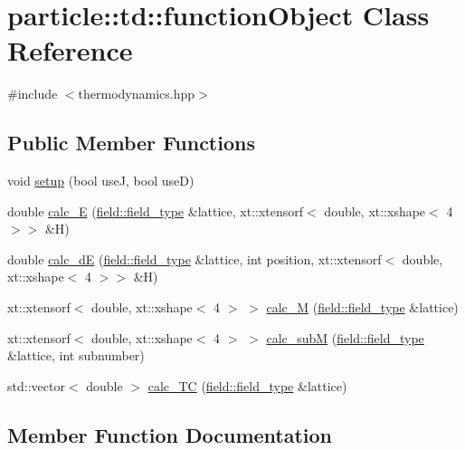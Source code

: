 \hypertarget{classparticle_1_1td_1_1functionObject}{}\section{particle\+:\+:td\+:\+:function\+Object Class Reference}
\label{classparticle_1_1td_1_1functionObject}


{\ttfamily \#include $<$thermodynamics.\+hpp$>$}

\subsection*{Public Member Functions}
\begin{DoxyCompactItemize}
\item 
void \hyperlink{classparticle_1_1td_1_1functionObject_a983e51c31ec252ab0567eb70bc0a8631}{setup} (bool useJ, bool useD)
\item 
double \hyperlink{classparticle_1_1td_1_1functionObject_a7fe36af330daf78dbe7ce3897e6dad3f}{calc\+\_\+E} (\hyperlink{classparticle_1_1field_1_1field__type}{field\+::field\+\_\+type} \&lattice, xt\+::xtensorf$<$ double, xt\+::xshape$<$ 4 $>$$>$ \&H)
\item 
double \hyperlink{classparticle_1_1td_1_1functionObject_a057b7d5d3315a6a36efa470d4136ceb7}{calc\+\_\+dE} (\hyperlink{classparticle_1_1field_1_1field__type}{field\+::field\+\_\+type} \&lattice, int position, xt\+::xtensorf$<$ double, xt\+::xshape$<$ 4 $>$$>$ \&H)
\item 
xt\+::xtensorf$<$ double, xt\+::xshape$<$ 4 $>$ $>$ \hyperlink{classparticle_1_1td_1_1functionObject_a60a3f8d3dc9160864d6c05bc4583b8b7}{calc\+\_\+M} (\hyperlink{classparticle_1_1field_1_1field__type}{field\+::field\+\_\+type} \&lattice)
\item 
xt\+::xtensorf$<$ double, xt\+::xshape$<$ 4 $>$ $>$ \hyperlink{classparticle_1_1td_1_1functionObject_a1b92821d8ef6d7aee3d0baeaeef6db1f}{calc\+\_\+subM} (\hyperlink{classparticle_1_1field_1_1field__type}{field\+::field\+\_\+type} \&lattice, int subnumber)
\item 
std\+::vector$<$ double $>$ \hyperlink{classparticle_1_1td_1_1functionObject_aef4fdc9fa9647aa342978820c2c9a4fc}{calc\+\_\+\+TC} (\hyperlink{classparticle_1_1field_1_1field__type}{field\+::field\+\_\+type} \&lattice)
\end{DoxyCompactItemize}


\subsection{Member Function Documentation}
